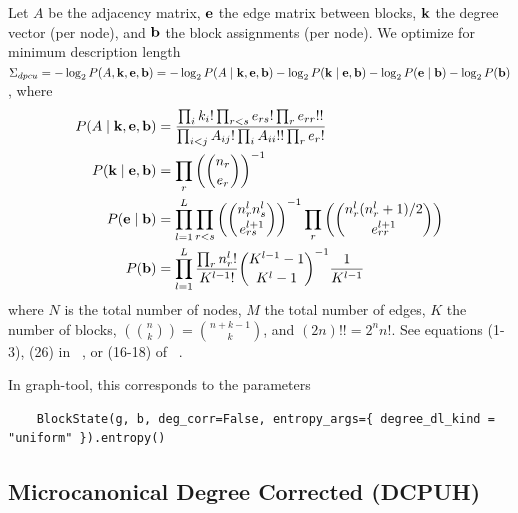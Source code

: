 \documentclass[aps,pre,superscriptaddress]{article}
\begin{document}
Let $A$ be the adjacency matrix, $\vb{e}$ the edge matrix between blocks, $\vb{k}$ the degree vector (per node), and $\vb{b}$ the block assignments (per node).
We optimize for minimum description length $\Sigma_{dpcu} = -\log_2P(A, \vb{k}, \vb{e}, \vb{b}) = -\log_2P(A \mid \vb{k}, \vb{e}, \vb{b}) - \log_2 P(\vb{k} \mid \vb{e}, \vb{b}) - \log_2 P(\vb{e} \mid \vb{b}) - \log_2 P(\vb{b}) $, where
\begin{align}
	P(A \mid \vb{k}, \vb{e}, \vb{b}) & = \frac{ \prod_i k_i! \prod_{r < s} e_{rs}! \prod_{r} e_{rr}!!} {\prod_{i < j} A_{ij}! \prod_i A_{ii}!! \prod_r e_r!}                                      \\
	P(\vb{k} \mid \vb{e}, \vb{b})    & = \prod_r \left( \binom{n_r}{e_r} \right)^{-1}                                                                                                             \\
	P(\vb{e} \mid \vb{b})            & = \prod_{l=1}^{L} \prod_{r < s} \left( \binom{n_r^l n_s^l}{e_{rs}^{l+1}} \right)^{-1} \prod_r \left( \binom{ n_r^l (n_r^l + 1) / 2 }{e_{rr}^{l+1} }\right) \\
	P(\vb{b})                        & = \prod_{l=1}^L \frac{\prod_r n_r^l!}{K^{l-1}!} \binom{ K^{l-1} - 1}{K^l - 1}^{-1} \frac{1}{K^{l-1}}
\end{align}
where $N$ is the total number of nodes, $M$ the total number of edges, $K$ the number of blocks, $\left( \binom{n}{k} \right) = \binom{n + k - 1}{k}$, and $(2n)!! = 2^n n!$.
See equations (1-3), (26) in ~\cite{peixoto17-01}, or (16-18) of ~\cite{funke19-04}.

In graph-tool, this corresponds to the parameters
\begin{verbatim}
    BlockState(g, b, deg_corr=False, entropy_args={ degree_dl_kind = "uniform" }).entropy()
\end{verbatim}

\subsection{Microcanonical Degree Corrected (DCPUH)}
\end{document}
